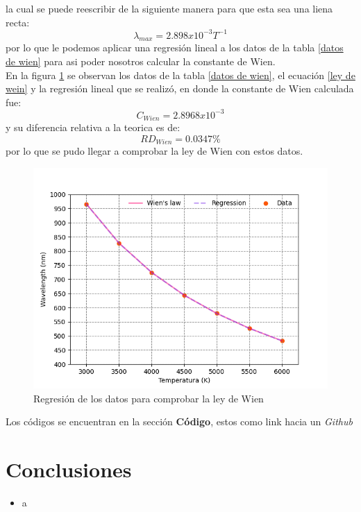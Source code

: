\documentclass[12pt,letterpaper]{article}
\begin{document}
\begin{multicols}{2}
la cual se puede reescribir de la siguiente manera para que esta sea una liena recta:
\begin{equation}
    \lambda_{max} = 2.898x10^{-3} T^{-1}
\end{equation}
por lo que le podemos aplicar una regresión lineal a los datos de la tabla \ref{datos de wien} para asi poder nosotros calcular la constante de Wien.\\
En la figura \ref{wienfig} se observan los datos de la tabla \ref{datos de wien}, el ecuación \ref{ley de wein} y la regresión lineal que se realizó, en donde la constante de Wien calculada fue:
\begin{equation*}
    C_{Wien}= 2.8968x10^{-3}
\end{equation*}
y su diferencia relativa a la teorica es de:
\begin{equation*}
    RD_{Wien}= 0.0347 \%
\end{equation*}
por lo que se pudo llegar a comprobar la ley de Wien con estos datos.
\begin{figure}[H]
\includegraphics[scale=0.45]{../Graphics/wien_law.png}
\caption{Regresión de los datos para comprobar la ley de Wien}
\label{wienfig}
\end{figure}
Los códigos se encuentran en la sección \textbf{Código}, estos como link hacia un \textit{Github}
\section*{Conclusiones}
\begin{itemize}
\item a
\end{itemize}

\end{multicols}
\end{document}
